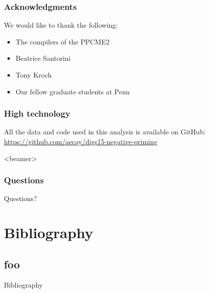 \documentclass{digs-slides}
\begin{document}
\begin{frame}
    \frametitle{Acknowledgments}
    We would like to thank the following:
    \begin{itemize}
      \item The compilers of the PPCME2
      \item Beatrice Santorini
      \item Tony Kroch
      \item Our fellow graduate students at Penn
    \end{itemize}
\end{frame}

\begin{frame}
    \frametitle{High technology}
    All the data and code used in this analysis is available on GitHub:
    \url{https://github.com/aecay/digs15-negative-priming}

\end{frame}

\begin{frame}<beamer>
    \frametitle{Questions}
    \begin{center}
        \Huge
        Questions?
    \end{center}
\end{frame}

\section{Bibliography}
\label{sec:bibliography}

\subsection*{foo}

\begin{frame}[allowframebreaks=0.9]{Bibliography}
    \printbibliography[heading=none]
\end{frame}
\end{document}
